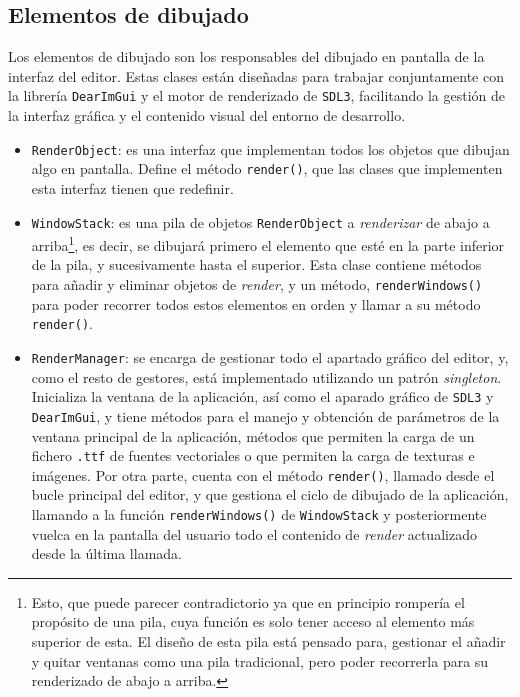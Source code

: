 \subsection{Elementos de dibujado}
\label{subsec:dibujado}
Los elementos de dibujado son los responsables del dibujado en pantalla de la interfaz del editor. Estas clases están diseñadas para trabajar conjuntamente con la librería \texttt{DearImGui} y el motor de renderizado de \texttt{SDL3}, facilitando la gestión de la interfaz gráfica y el contenido visual del entorno de desarrollo.

\begin{itemize}
	\item \texttt{RenderObject}: es una interfaz que implementan todos los objetos que dibujan algo en pantalla. Define el método \texttt{render()}, que las clases que implementen esta interfaz tienen que redefinir.
	\item \texttt{WindowStack}: es una pila de objetos \texttt{RenderObject} a \textit{renderizar} de abajo a arriba\footnote{Esto, que puede parecer contradictorio ya que en principio rompería el propósito de una pila, cuya función es solo tener acceso al elemento más superior de esta. El diseño de esta pila está pensado para, gestionar el añadir y quitar ventanas como una pila tradicional, pero poder recorrerla para su renderizado de abajo a arriba.}, es decir, se dibujará primero el elemento que esté en la parte inferior de la pila, y sucesivamente hasta el superior. Esta clase contiene métodos para añadir y eliminar objetos de \textit{render}, y un método, \texttt{renderWindows()} para poder recorrer todos estos elementos en orden y llamar a su método \texttt{render()}.
	\item \texttt{RenderManager}: se encarga de gestionar todo el apartado gráfico del editor, y, como el resto de gestores, está implementado utilizando un patrón \textit{singleton}. Inicializa la ventana de la aplicación, así como el aparado gráfico de \texttt{SDL3} y \texttt{DearImGui}, y tiene métodos para el manejo y obtención de parámetros de la ventana principal de la aplicación, métodos que permiten la carga de un fichero \texttt{.ttf} de fuentes vectoriales o que permiten la carga de texturas e imágenes. Por otra parte, cuenta con el método \texttt{render()}, llamado desde el bucle principal del editor, y que gestiona el ciclo de dibujado de la aplicación, llamando a la función \texttt{renderWindows()} de \texttt{WindowStack} y posteriormente vuelca en la pantalla del usuario todo el contenido de \textit{render} actualizado desde la última llamada. 

\end{itemize}
